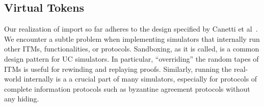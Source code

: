 %
%
%
%
%

\subsection{Virtual Tokens}
Our realization of import so far adheres to the design specified by Canetti et al~\cite{uc}.
We encounter a subtle problem when implementing simulators that internally run other ITMs, functionalities, or protocols.
Sandboxing, as it is called, is a common design pattern for UC simulators. 
In particular, ``overriding'' the random tapes of ITMs is useful for rewinding and replaying proofs.
Similarly, running the real-world internally is a a crucial part of many simulators, especially for protocols of complete information protocols such as byzantine agreement protocols without any hiding. 

